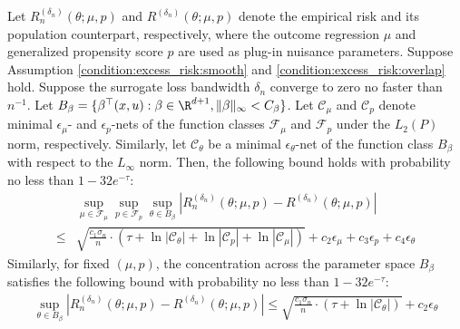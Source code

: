 \begin{lemma}\label{lemma:empirical_loss_deviation_parametric} Let
$R_n^{({\delta_n})}(\theta;\mu,p)$ and $R^{({\delta_n})}(\theta;\mu,p)$
denote the empirical risk and its population counterpart, respectively, where the outcome regression $\mu$ and generalized propensity score $p$ are used as plug-in nuisance parameters. Suppose Assumption \ref{condition:excess_risk:smooth} and \ref{condition:excess_risk:overlap} hold. Suppose the surrogate loss bandwidth $\delta_n$ converge to zero no faster than $n^{-1}$. Let $B_\beta = \{\beta^\top (x,u):\beta\in\R^{d+1},\|\beta\|_\infty<C_\beta\}$. Let $\mathcal{C}_\mu$ and $\mathcal{C}_p$ denote minimal $\epsilon_\mu$- and $\epsilon_p$-nets of the function classes $\mathcal{F}_\mu$ and $\mathcal{F}_p$ under the $L_2(P)$ norm, respectively. Similarly, let $\mathcal{C}_\theta$ be a minimal $\epsilon_\theta$-net of the function class $B_{\beta}$ with respect to the $L_\infty$ norm. Then, the following bound holds with probability no less than $1 - 32e^{-\tau}$: 
\begin{align*}
&\sup_{\mu\in\mathcal{F}_\mu}\sup_{p\in\mathcal{F}_p}\sup_{\theta\in B_{\beta}}\left| R_n^{({\delta_n})}(\theta;\mu,p) - R^{({\delta_n})}(\theta;\mu,p)\right|\\
    \leq &\sqrt{\frac{ c_1\sigma_n}{n}\cdot\left(\tau +\ln|\mathcal{C}_\theta|+\ln|\mathcal{C}_p|+\ln|\mathcal{C}_\mu|\right)} + c_2\epsilon_\mu + c_3\epsilon_p + c_4\epsilon_\theta
\end{align*}
Similarly, for fixed $(\mu, p)$, the concentration across the parameter space $B_\beta$ satisfies the following bound with probability no less than $1 - 32e^{-\tau}$:
\begin{align*}
\sup_{\theta\in B_{\beta}}\left| R_n^{({\delta_n})}(\theta;\mu,p) - R^{({\delta_n})}(\theta;\mu,p)\right|
    \leq \sqrt{\frac{ c_1\sigma_n}{n}\cdot\left(\tau +\ln|\mathcal{C}_\theta|\right)} + c_2\epsilon_\theta    
\end{align*}
\end{lemma}


